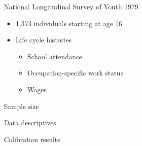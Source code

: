 \begin{frame}{National Longitudinal Survey of Youth 1979}\vspace{0.25cm}

	\begin{itemize}\setlength\itemsep{1em}
	\item 1,373 individuals starting at age 16
	\item Life cycle histories\medskip
	\begin{itemize}\setlength\itemsep{1em}
		\item School attendance
		\item Occupation-specific work status
		\item Wages
	\end{itemize}
\end{itemize}
\end{frame}
\begin{frame}{Sample size}
  \begin{figure}
  \end{figure}
\end{frame}
\begin{frame}{Data descriptives}
  \begin{figure}[h!]\centering
  \setcounter{subfigure}{0}
  \hspace{0.5cm}
  \end{figure}
\end{frame}
\begin{frame}{Calibration results}
  \begin{figure}[h!]\centering
  \setcounter{subfigure}{0}
  \hspace{0.5cm}
  \end{figure}
\end{frame}
